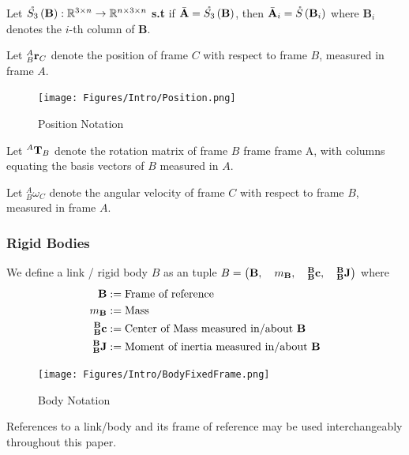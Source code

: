 \begin{definition}
Let $\Sn{\mathbf{B}} : \mathbb{R}^{3 \times n} \rightarrow \mathbb{R}^{n \times 3 \times n}$  \textbf{s.t}  if $\bar{\mathbf{A}} = \Sn{\mathbf{B}}$, then $\bar{\mathbf{A}}_i = \S{\mathbf{B}_{i}}$ where $\mathbf{B}_{i}$ denotes the $i$-th column of $\mathbf{B}$.
\end{definition}

\begin{definition}Let $^A_B\r_C$ denote the position of frame $C$ with respect to frame $B$, measured in frame $A$.
\begin{figure}[H]
    \centering
    \texttt{[image: Figures/Intro/Position.png]}
    \caption{Position Notation}
    \label{fig:position_notation}
\end{figure}
\end{definition}

\begin{definition}Let $^A\T_B$ denote the rotation matrix of frame $B$ frame frame A, with columns equating the basis vectors of $B$ measured in $A$.
\end{definition}

\begin{definition}Let $^A_B\omega_C$ denote the angular velocity of frame $C$ with respect to frame $B$, measured in frame $A$.
\end{definition}

\subsubsection{Rigid Bodies}

\begin{definition}
We define a link / rigid body $B$ as an tuple $B = \left (\B, \quad m_\B, \quad \BB\com, \quad \BB\J \right )$ where
\begin{align*}
    \B &:= \text{Frame of reference} \\
    m_\B &:= \text{Mass} \\
    \BB\com &:= \text{Center of Mass measured in/about $\B$} \\
    \BB\J &:= \text{Moment of inertia measured in/about $\B$} \\
\end{align*}
\begin{figure}[H]
    \centering
    \texttt{[image: Figures/Intro/BodyFixedFrame.png]}
    \caption{Body Notation}
    \label{fig:body_notation}
\end{figure}

\noindent References to a link/body and its frame of reference may be used interchangeably throughout this paper.
\end{definition}

